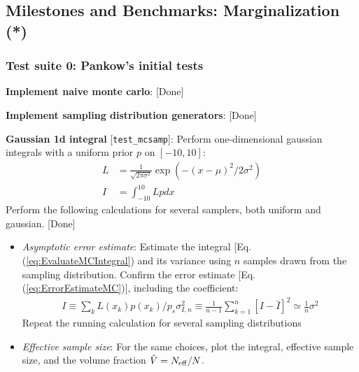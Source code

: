 \documentclass[twocolumn,prd,nofootinbib]{revtex4}
\newcommand\editremark[1]{{\color{red} #1}}
\begin{document}
\begin{widetext}
\subsection{Milestones and Benchmarks: Marginalization (*)}



\subsubsection{Test suite 0: Pankow's initial tests}
\noindent \textbf{Implement naive monte carlo}: [Done]

\noindent \textbf{Implement sampling distribution generators}: [Done]


\noindent \textbf{Gaussian 1d integral} [\texttt{test\_mcsamp}]: Perform  one-dimensional gaussian integrals with a uniform
prior $p$ on $[-10,10]$:
\begin{align}
L &= \frac{1}{\sqrt{2\pi \sigma^2} } \exp (-(x-\mu)^2/2\sigma^2)  \\
I &= \int_{-10}^{10} L  p dx
\end{align}
Perform the following calculations for several samplers, both uniform and gaussian.  [Done]
\begin{itemize}
\item \emph{Asymptotic error estimate}: Estimate the integral [Eq. (\ref{eq:EvaluateMCIntegral}) and its variance using
  $n$ samples drawn from the sampling distribution.  Confirm the error   estimate [Eq. (\ref{eq:ErrorEstimateMC})], including the coefficient:
\begin{align}
I \equiv \sum_k L(x_k) p(x_k)/p_s
\sigma_{I,n}^2 \equiv \frac{1}{n-1}\sum_{k=1}^n[ I - \bar{I}]^2 \simeq \frac{1}{n}  \sigma^2
\end{align}
Repeat the running calculation for several sampling distributions
\item \emph{Effective sample size}: For the same choices, plot the integral, effective sample size, and the volume
  fraction $\hat{V}=N_{\rm eff}/N$. 
\end{itemize}


\end{widetext}
\end{document}
